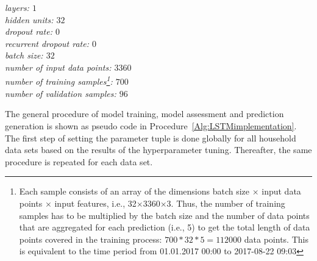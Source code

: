 \indent\textit{layers: $1$\\
\indent hidden units: $32$\\
\indent dropout rate: $0$\\
\indent recurrent dropout rate: $0$\\
\indent batch size: $32$\\
\indent number of input data points: $3360$\\
\indent number of training samples\footnote{Each sample consists of an array of the dimensions batch size $\times$ input data points $\times$ input features, i.e., 32$\times$3360$\times$3. Thus, the number of training samples has to be multiplied by the batch size and the number of data points that are aggregated for each prediction (i.e., 5) to get the total length of data points covered in the training process: $700*32*5=112000$ data points. This is equivalent to the time period from 01.01.2017 00:00 to 2017-08-22 09:03}: $700$ \\
\indent number of validation samples: $96$}

The general procedure of model training, model assessment and prediction generation is shown as pseudo code in Procedure~\ref{Alg:LSTMimplementation}. The first step of setting the parameter tuple is done globally for all household data sets based on the results of the hyperparameter tuning. Thereafter, the same procedure is repeated for each data set.

